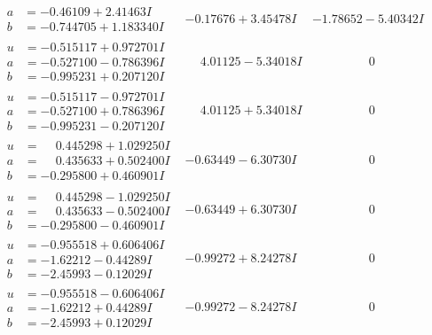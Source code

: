 \documentclass[1p]{elsarticle_modified}
\theoremstyle{definition}
\begin{document}
$$\begin{array}{c|c|c}
\begin{aligned}
a &= -0.46109 + 2.41463 I \\
b &= -0.744705 + 1.183340 I\end{aligned}
 & -0.17676 + 3.45478 I & -1.78652 - 5.40342 I \\ \hline\begin{aligned}
u &= -0.515117 + 0.972701 I \\
a &= -0.527100 - 0.786396 I \\
b &= -0.995231 + 0.207120 I\end{aligned}
 & \phantom{-}4.01125 - 5.34018 I & \phantom{-0.000000 } 0 \\ \hline\begin{aligned}
u &= -0.515117 - 0.972701 I \\
a &= -0.527100 + 0.786396 I \\
b &= -0.995231 - 0.207120 I\end{aligned}
 & \phantom{-}4.01125 + 5.34018 I & \phantom{-0.000000 } 0 \\ \hline\begin{aligned}
u &= \phantom{-}0.445298 + 1.029250 I \\
a &= \phantom{-}0.435633 + 0.502400 I \\
b &= -0.295800 + 0.460901 I\end{aligned}
 & -0.63449 - 6.30730 I & \phantom{-0.000000 } 0 \\ \hline\begin{aligned}
u &= \phantom{-}0.445298 - 1.029250 I \\
a &= \phantom{-}0.435633 - 0.502400 I \\
b &= -0.295800 - 0.460901 I\end{aligned}
 & -0.63449 + 6.30730 I & \phantom{-0.000000 } 0 \\ \hline\begin{aligned}
u &= -0.955518 + 0.606406 I \\
a &= -1.62212 - 0.44289 I \\
b &= -2.45993 - 0.12029 I\end{aligned}
 & -0.99272 + 8.24278 I & \phantom{-0.000000 } 0 \\ \hline\begin{aligned}
u &= -0.955518 - 0.606406 I \\
a &= -1.62212 + 0.44289 I \\
b &= -2.45993 + 0.12029 I\end{aligned}
 & -0.99272 - 8.24278 I & \phantom{-0.000000 } 0 \\ \hline\begin{aligned}

\end{aligned}
\end{array}$$
\end{document}
